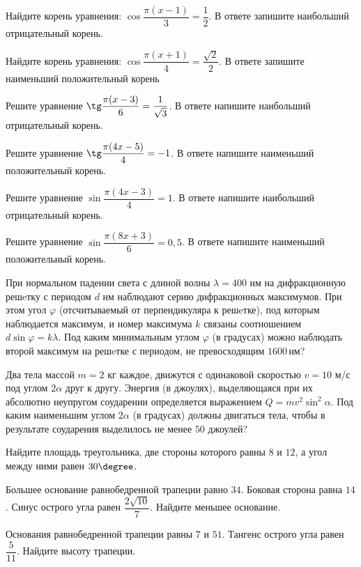 \begin{class}[number=4]
	\begin{listofex}
		\item Найдите корень уравнения: \( \cos \dfrac{ \pi(x-1) }{ 3 }=\dfrac{ 1 }{ 2 } \). В ответе запишите наибольший отрицательный корень.
		\item Найдите корень уравнения: \( \cos \dfrac{ \pi(x+1) }{ 4 }=\dfrac{ \sqrt{2} }{ 2 } \). В ответе запишите наименьший положительный корень
		\item Решите уравнение \(\tg \dfrac{ \pi(x-3) }{ 6 }= \dfrac{ 1 }{ \sqrt{3} }\). В ответе напишите наибольший отрицательный корень.
		\item Решите уравнение \(\tg \dfrac{ \pi(4x-5) }{4 }= -1\). В ответе напишите наименьший положительный корень.
		\item Решите уравнение \( \sin \dfrac{ \pi(4x-3) }{ 4 }=1 \). В ответе напишите наибольший отрицательный корень.
		\item Решите уравнение \( \sin \dfrac{ \pi(8x+3) }{ 6 }=0,5 \). В ответе напишите наименьший положительный корень.
		\item При нормальном падении света с длиной волны \( \lambda=400 \) нм на дифракционную решeтку с периодом \(d\) нм наблюдают серию дифракционных максимумов. При этом угол \(\varphi\)  (отсчитываемый от перпендикуляра к решeтке), под которым наблюдается максимум, и номер максимума \(k\) связаны соотношением \(d \sin \varphi= k\lambda\). Под каким минимальным углом \(\varphi\) (в градусах) можно наблюдать второй максимум на решeтке с периодом, не превосходящим \(1600\) нм?
		\item Два тела массой \(m=2\) кг каждое, движутся с одинаковой скоростью  \(v =10\) м/с под углом \(2\alpha\) друг к другу. Энергия (в джоулях), выделяющаяся при их абсолютно неупругом соударении определяется выражением \(Q= m v^2 \sin^2 \alpha \). Под каким наименьшим углом \(2\alpha\) (в градусах) должны двигаться тела, чтобы в результате соударения выделилось не менее \(50\) джоулей?
		\item Найдите площадь треугольника, две стороны которого равны \(8\) и \(12\), а угол между ними равен \(30 \degree\).
		\item Большее основание равнобедренной трапеции равно \(34\). Боковая сторона равна \(14\). Синус острого угла равен \( \dfrac{ 2\sqrt{10}}{ 7 } \). Найдите меньшее основание.
		\item Основания равнобедренной трапеции равны \(7\) и \(51\). Тангенс острого угла равен \( \dfrac{ 5 }{ 11 } \).  Найдите высоту трапеции.
	\end{listofex}
\end{class}

